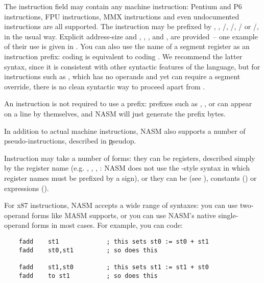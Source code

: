 The instruction field may contain any machine instruction: Pentium
and P6 instructions, FPU instructions, MMX instructions and even
undocumented instructions are all supported. The instruction may be
prefixed by , , /,
/, / or
/, in the usual way. Explicit
address-size and 
, , , 
and ,  are provided~-- one example of their
use is given in . You can also use the name of a
segment register as an instruction prefix: coding
 is equivalent to coding .
We recommend the latter syntax, since it is consistent with other syntactic
features of the language, but for instructions such as , which
has no operands and yet can require a segment override, there is no clean
syntactic way to proceed apart from .

An instruction is not required to use a prefix: prefixes such as
, ,  or  can appear on
a line by themselves, and NASM will just generate the prefix bytes.

In addition to actual machine instructions, NASM also supports a
number of pseudo-instructions, described in \k{pseudop}.

Instruction  may take a number of forms: they can be
registers, described simply by the register name (e.g. ,
, , : NASM does not use the -style
syntax in which register names must be prefixed by a \code{\%} sign),
or they can be  (see ),
constants () or expressions ().

For x87  instructions, NASM accepts a wide
range of syntaxes: you can use two-operand forms like MASM supports,
or you can use NASM's native single-operand forms in most cases.
For example, you can code:

\begin{lstlisting}
	fadd    st1             ; this sets st0 := st0 + st1
	fadd    st0,st1         ; so does this

	fadd    st1,st0         ; this sets st1 := st1 + st0
	fadd    to st1          ; so does this
\end{lstlisting}

